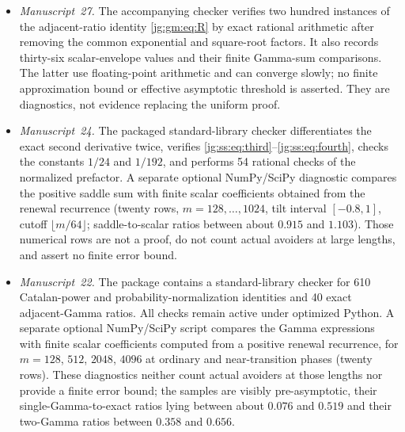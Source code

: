 \documentclass[11pt,a4paper]{article}
\theoremstyle{definition}\newaliascnt{definition}{theorem}
\theoremstyle{remark}\newaliascnt{remark}{theorem}
\begin{document}
\begin{itemize}
 thirty-six finite squared-envelope values computed by the scalar recurrence.
 It uses high-precision and ordinary floating-point arithmetic and is
 explicitly diagnostic. No numerical error enclosure or asymptotic cutoff is
 claimed; the theorem follows from the written uniform estimates and exact
 inclusions.
\item \emph{Manuscript~27.} The accompanying checker verifies two hundred
 instances of the adjacent-ratio identity \eqref{jg:gm:eq:R} by exact rational
 arithmetic after removing the common exponential and square-root factors. It
 also records thirty-six scalar-envelope values and their finite Gamma-sum
 comparisons. The latter use floating-point arithmetic and can converge slowly;
 no finite approximation bound or effective asymptotic threshold is asserted.
 They are diagnostics, not evidence replacing the uniform proof.
\item \emph{Manuscript~24.} The packaged standard-library checker differentiates
 the exact second derivative twice, verifies
 \eqref{jg:ss:eq:third}--\eqref{jg:ss:eq:fourth}, checks the constants $1/24$
 and $1/192$, and performs 54 rational checks of the normalized prefactor. A
 separate optional NumPy/SciPy diagnostic compares the positive saddle sum with
 finite scalar coefficients obtained from the renewal recurrence (twenty rows,
 $m=128,\ldots,1024$, tilt interval $[-0.8,1]$, cutoff $\lfloor m/64\rfloor$;
 saddle-to-scalar ratios between about $0.915$ and $1.103$). Those numerical
 rows are not a proof, do not count actual avoiders at large lengths, and assert
 no finite error bound.
\item \emph{Manuscript~22.} The package contains a standard-library checker for
 610 Catalan-power and probability-normalization identities and 40 exact
 adjacent-Gamma ratios. All checks remain active under optimized Python. A
 separate optional NumPy/SciPy script compares the Gamma expressions with finite
 scalar coefficients computed from a positive renewal recurrence, for
 $m=128$, $512$, $2048$, $4096$ at ordinary and near-transition phases (twenty
 rows). These diagnostics neither count actual avoiders at those lengths nor
 provide a finite error bound; the samples are visibly pre-asymptotic, their
 single-Gamma-to-exact ratios lying between about $0.076$ and $0.519$ and their
 two-Gamma ratios between $0.358$ and $0.656$.
\end{itemize}
\end{document}
